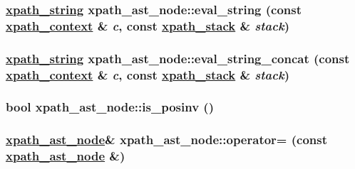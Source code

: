 \hypertarget{classxpath__ast__node_6b675237a590548b68d0e0b97518b6df}{
\subsubsection[eval\_\-string]{\setlength{\rightskip}{0pt plus 5cm}\hyperlink{classxpath__string}{xpath\_\-string} xpath\_\-ast\_\-node::eval\_\-string (const \hyperlink{structxpath__context}{xpath\_\-context} \& {\em c}, const \hyperlink{structxpath__stack}{xpath\_\-stack} \& {\em stack})}}
\label{classxpath__ast__node_6b675237a590548b68d0e0b97518b6df}


\hypertarget{classxpath__ast__node_af931a091af0fb91c25e90b205363b4e}{
\subsubsection[eval\_\-string\_\-concat]{\setlength{\rightskip}{0pt plus 5cm}\hyperlink{classxpath__string}{xpath\_\-string} xpath\_\-ast\_\-node::eval\_\-string\_\-concat (const \hyperlink{structxpath__context}{xpath\_\-context} \& {\em c}, const \hyperlink{structxpath__stack}{xpath\_\-stack} \& {\em stack})}}
\label{classxpath__ast__node_af931a091af0fb91c25e90b205363b4e}


\hypertarget{classxpath__ast__node_9253f88832441a357ea65639c73a34be}{
\subsubsection[is\_\-posinv]{\setlength{\rightskip}{0pt plus 5cm}bool xpath\_\-ast\_\-node::is\_\-posinv ()}}
\label{classxpath__ast__node_9253f88832441a357ea65639c73a34be}


\hypertarget{classxpath__ast__node_60fddea92b095c2b8705f12f7309e6aa}{
\subsubsection[operator=]{\setlength{\rightskip}{0pt plus 5cm}\hyperlink{classxpath__ast__node}{xpath\_\-ast\_\-node}\& xpath\_\-ast\_\-node::operator= (const \hyperlink{classxpath__ast__node}{xpath\_\-ast\_\-node} \&)}}
\label{classxpath__ast__node_60fddea92b095c2b8705f12f7309e6aa}


